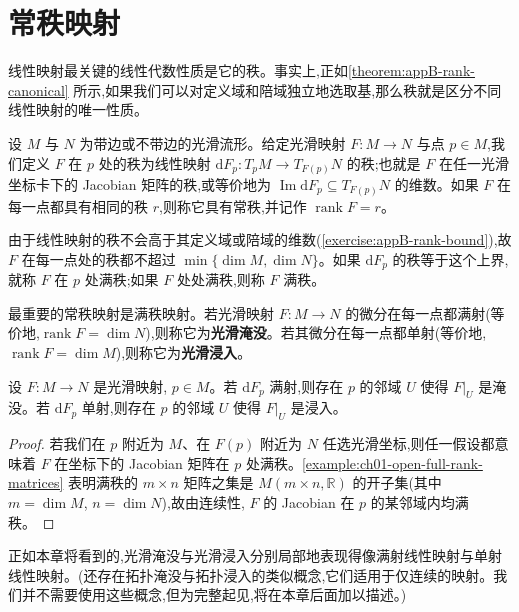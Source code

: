 \documentclass[../../main.tex]{subfiles}
\begin{document}
\section{常秩映射}\label{section:ch04-常秩映射}

线性映射最关键的线性代数性质是它的秩。事实上,正如\cref{theorem:appB-rank-canonical} 所示,如果我们可以对定义域和陪域独立地选取基,那么秩就是区分不同线性映射的唯一性质。

设 $M$ 与 $N$ 为带边或不带边的光滑流形。给定光滑映射 $F:M\to N$ 与点 $p\in M$,我们定义 $F$ 在 $p$ 处的秩为线性映射 $\mathrm{d}F_p:T_pM\to T_{F(p)}N$ 的秩;也就是 $F$ 在任一光滑坐标卡下的 Jacobian 矩阵的秩,或等价地为 $\operatorname{Im}\mathrm{d}F_p\subseteq T_{F(p)}N$ 的维数。如果 $F$ 在每一点都具有相同的秩 $r$,则称它具有常秩,并记作 $\operatorname{rank}F=r$。

由于线性映射的秩不会高于其定义域或陪域的维数(\cref{exercise:appB-rank-bound}),故 $F$ 在每一点处的秩都不超过 $\min\{\dim M,\dim N\}$。如果 $\mathrm{d}F_p$ 的秩等于这个上界,就称 $F$ 在 $p$ 处满秩;如果 $F$ 处处满秩,则称 $F$ 满秩。

最重要的常秩映射是满秩映射。若光滑映射 $F:M\to N$ 的微分在每一点都满射(等价地,$\operatorname{rank}F=\dim N$),则称它为\textbf{光滑淹没}。若其微分在每一点都单射(等价地,$\operatorname{rank}F=\dim M$),则称它为\textbf{光滑浸入}。

\begin{proposition}\label{proposition:ch04-full-rank-open}
设 $F:M\to N$ 是光滑映射, $p\in M$。若 $\mathrm{d}F_p$ 满射,则存在 $p$ 的邻域 $U$ 使得 $F|_U$ 是淹没。若 $\mathrm{d}F_p$ 单射,则存在 $p$ 的邻域 $U$ 使得 $F|_U$ 是浸入。
\end{proposition}

\begin{proof}
若我们在 $p$ 附近为 $M$、在 $F(p)$ 附近为 $N$ 任选光滑坐标,则任一假设都意味着 $F$ 在坐标下的 Jacobian 矩阵在 $p$ 处满秩。\cref{example:ch01-open-full-rank-matrices} 表明满秩的 $m\times n$ 矩阵之集是 $M(m\times n,\mathbb{R})$ 的开子集(其中 $m=\dim M$, $n=\dim N$),故由连续性, $F$ 的 Jacobian 在 $p$ 的某邻域内均满秩。
\end{proof}

正如本章将看到的,光滑淹没与光滑浸入分别局部地表现得像满射线性映射与单射线性映射。(还存在拓扑淹没与拓扑浸入的类似概念,它们适用于仅连续的映射。我们并不需要使用这些概念,但为完整起见,将在本章后面加以描述。)
\end{document}
